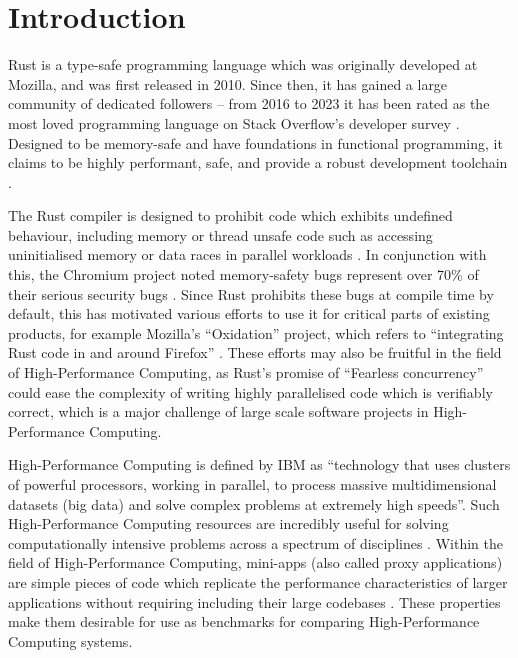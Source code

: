 \chapter{Introduction}
\label{ch:introduction}

Rust is a type-safe programming language which was originally developed at Mozilla, and was first released in 2010. Since then, it has gained a large community of dedicated followers -- from 2016 to 2023 it has been rated as the most loved programming language on Stack Overflow's developer survey \cite{StackOverflowDeveloper}. Designed to be memory-safe and have foundations in functional programming, it claims to be highly performant, safe, and provide a robust development toolchain \cite{RustProgrammingLanguage}.

The Rust compiler is designed to prohibit code which exhibits undefined behaviour, including memory or thread unsafe code such as accessing uninitialised memory or data races in parallel workloads \cite{BehaviorConsideredUndefined}. In conjunction with this, the Chromium project noted memory-safety bugs represent over 70\% of their serious security bugs \cite{MemorySafety}. Since Rust prohibits these bugs at compile time by default, this has motivated various efforts to use it for critical parts of existing products, for example Mozilla's ``Oxidation'' project, which refers to ``integrating Rust code in and around Firefox'' \cite{OxidationMozillaWiki}. These efforts may also be fruitful in the field of High-Performance Computing, as Rust's promise of ``Fearless concurrency'' \cite{klabnikFearlessConcurrency2018} could ease the complexity of writing highly parallelised code which is verifiably correct, which is a major challenge of large scale software projects in High-Performance Computing.

High-Performance Computing is defined by IBM as ``technology that uses clusters of powerful processors, working in parallel, to process massive multidimensional datasets (big data) and solve complex problems at extremely high speeds''\cite{WhatHPCIntroduction}. Such High-Performance Computing resources are incredibly useful for solving computationally intensive problems across a spectrum of disciplines \cite{JournalDescriptionInternational}.
Within the field of High-Performance Computing, mini-apps (also called proxy applications) are simple pieces of code which replicate the performance characteristics of larger applications without requiring including their large codebases \cite{heroux2013mantevo}. These properties make them desirable for use as benchmarks for comparing High-Performance Computing systems.

